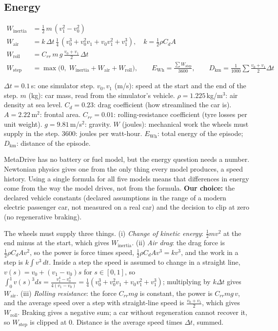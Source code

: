 \subsection{Energy}
\begin{align*}
W_{\text{inertia}} &= \tfrac12\, m\,(v_1^2-v_0^2)\\
W_{\text{air}} &= k\,\Delta t\,\tfrac14\,(v_0^3+v_0^2v_1+v_0v_1^2+v_1^3),\quad k=\tfrac12\rho C_dA\\
W_{\text{roll}} &= C_{rr}\,m\,g\,\tfrac{v_0+v_1}{2}\,\Delta t\\
W_{\text{step}} &= \max\big(0,\;W_{\text{inertia}}+W_{\text{air}}+W_{\text{roll}}\big),\qquad E_{\text{Wh}}=\frac{\sum W_{\text{step}}}{3600},\qquad D_{\text{km}}=\frac1{1000}\sum\tfrac{v_0+v_1}{2}\Delta t
\end{align*}
\begin{description}[leftmargin=2.6cm,style=nextline]
\item[Symbols] $\Delta t=0.1$\,s: one simulator step. $v_0,v_1$ (m/s): speed at the start and the end of the step. $m$ (kg): car mass, read from the simulator's vehicle. $\rho=1.225$\,kg/m$^3$: air density at sea level. $C_d=0.23$: drag coefficient (how streamlined the car is). $A=2.22$\,m$^2$: frontal area. $C_{rr}=0.01$: rolling-resistance coefficient (tyre losses per unit weight). $g=9.81$\,m/s$^2$: gravity. $W$ (joules): mechanical work the wheels must supply in the step. $3600$: joules per watt-hour. $E_{\text{Wh}}$: total energy of the episode; $D_{\text{km}}$: distance of the episode.
\item[Why] MetaDrive has no battery or fuel model, but the energy question needs a number. Newtonian physics gives one from the only thing every model produces, a speed history. Using a single formula for all five models means that differences in energy come from the way the model drives, not from the formula. \textbf{Our choice:} the declared vehicle constants (declared assumptions in the range of a modern electric passenger car, not measured on a real car) and the decision to clip at zero (no regenerative braking).
\item[Derivation] The wheels must supply three things. (i) \emph{Change of kinetic energy}: $\tfrac12mv^2$ at the end minus at the start, which gives $W_{\text{inertia}}$. (ii) \emph{Air drag}: the drag force is $\tfrac12\rho C_dAv^2$, so the power is force times speed, $\tfrac12\rho C_dAv^3=kv^3$, and the work in a step is $k\int v^3\,dt$. Inside a step the speed is assumed to change in a straight line, $v(s)=v_0+(v_1-v_0)s$ for $s\in[0,1]$, so $\int_0^1 v(s)^3ds=\frac{v_1^4-v_0^4}{4(v_1-v_0)}=\tfrac14(v_0^3+v_0^2v_1+v_0v_1^2+v_1^3)$; multiplying by $k\Delta t$ gives $W_{\text{air}}$. (iii) \emph{Rolling resistance}: the force $C_{rr}mg$ is constant, the power is $C_{rr}mg\,v$, and the average speed over a step with straight-line speed is $\tfrac{v_0+v_1}{2}$, which gives $W_{\text{roll}}$. Braking gives a negative sum; a car without regeneration cannot recover it, so $W_{\text{step}}$ is clipped at 0. Distance is the average speed times $\Delta t$, summed.

\end{description}
